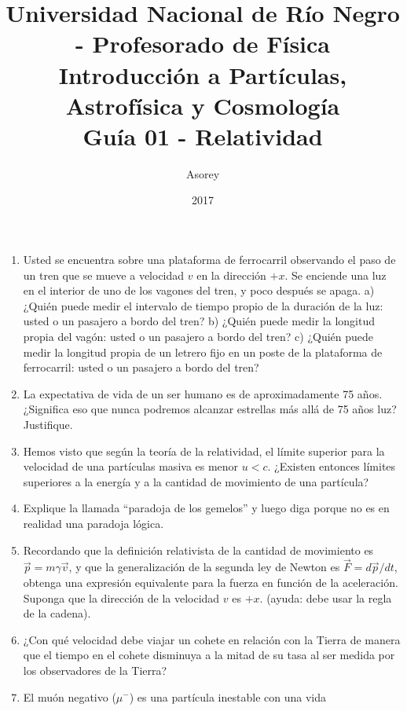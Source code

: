 \documentclass[a4paper,12pt]{article}
\begin{document}
\title{
{\normalsize{Universidad Nacional de Río Negro - Profesorado de Física}}\\
Introducción a Partículas, Astrofísica y Cosmología \\ Guía 01 - Relatividad\\}
\author{Asorey}
\date{2017}
\maketitle

\begin{enumerate}
	\setcounter{enumi}{0}      %
	\item Usted se encuentra sobre una plataforma de ferrocarril observando el
		paso de un tren que se mueve a velocidad $v$ en la dirección $+x$. Se
		enciende una luz en el interior de uno de los vagones del tren, y poco
		después se apaga. a) ¿Quién puede medir el intervalo de tiempo propio
		de la duración de la luz: usted o un pasajero a bordo del tren? b)
		¿Quién puede medir la longitud propia del vagón: usted o un pasajero a
		bordo del tren? c) ¿Quién puede medir la longitud propia de un letrero
		fijo en un poste de la plataforma de ferrocarril: usted o un pasajero a
		bordo del tren?
	\item La expectativa de vida de un ser humano es de aproximadamente 75
		años. ¿Significa eso que nunca podremos alcanzar estrellas más allá de
		75 años luz? Justifique. 
	\item Hemos visto que según la teoría de la relatividad, el límite superior
		para la velocidad de una partículas masiva es menor $u < c$. ¿Existen
		entonces límites superiores a la energía y a la cantidad de movimiento
		de una partícula?
	\item Explique la llamada ``paradoja de los gemelos'' y luego diga porque
		no es en realidad una paradoja lógica.
	\item Recordando que la definición relativista de la cantidad de movimiento
		es $\vec{p}=m \gamma \vec{v}$, y que la generalización de la segunda
		ley de Newton es $\vec{F}=d\vec{p}/dt$, obtenga una expresión
		equivalente para la fuerza en función de la aceleración. Suponga que la
		dirección de la velocidad $v$ es $+x$. (ayuda: debe usar la regla de la
		cadena).   
	\item ¿Con qué velocidad debe viajar un cohete en relación con la Tierra de
		manera que el tiempo en el cohete disminuya a la mitad de su tasa al
		ser medida por los observadores de la Tierra?
	\item El muón negativo ($\mu^-$) es una partícula inestable con una vida

\end{enumerate}
\end{document}
